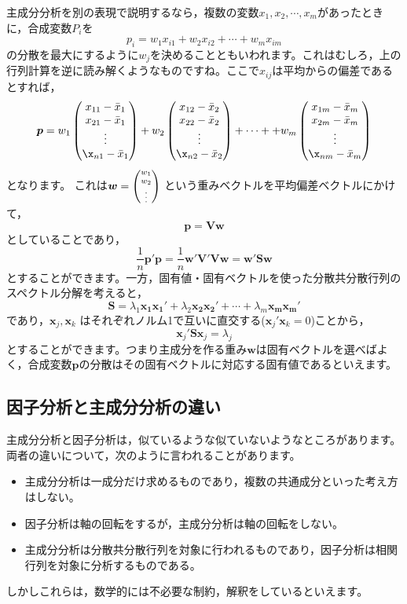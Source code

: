 \documentclass{ltjsbook}
\begin{document}
主成分分析を別の表現で説明するなら，複数の変数$x_1,x_2,\cdots,x_m$があったときに，合成変数$P_i$を
\[ p_i = w_1x_{i1} + w_2x_{i2}+\cdots+w_mx_{im} \]
の分散を最大にするように$w_j$を決めることともいわれます。これはむしろ，上の行列計算を逆に読み解くようなものですね。ここで$x_{ij}$は平均からの偏差であるとすれば，
\[\bm{p} = w_1\begin{pmatrix}x_{11}-\bar{x}_1\\x_{21}-\bar{x}_1\\\vdots\\\x_{n1}-\bar{x}_1\end{pmatrix}
	+w_2 \begin{pmatrix}x_{12}-\bar{x}_2\\x_{22}-\bar{x}_2\\\vdots\\\x_{n2}-\bar{x}_2\end{pmatrix}
	+\cdots+
	+w_m \begin{pmatrix}x_{1m}-\bar{x}_m\\x_{2m}-\bar{x}_m\\\vdots\\\x_{nm}-\bar{x}_m\end{pmatrix}
\]
となります。
これは$\bm{w} =\scriptsize \begin{pmatrix}w_1\\w_2\\\vdots\end{pmatrix}$ という重みベクトルを平均偏差ベクトルにかけて，
\[ \bm{p}=\bm{Vw} \]
としていることであり，
\[ \frac{1}{n}\bm{p}'\bm{p} = \frac{1}{n}\bm{w}'\bm{V}'\bm{V}\bm{w} = \bm{w}'\bm{Sw}\]
とすることができます。一方，固有値・固有ベクトルを使った分散共分散行列のスペクトル分解を考えると，
\[ \bm{S} = \lambda_1 \bm{x_1x_1}'+\lambda_2 \bm{x_2x_2}'+\cdots+\lambda_m \bm{x_mx_m}'\]
であり，$\bm{x}_j,\bm{x}_k$ はそれぞれノルム1で互いに直交する($\bm{x}_j'\bm{x}_k=0$)ことから，
\[ \bm{x}_j'\bm{Sx}_j = \lambda_j \]
とすることができます。つまり主成分を作る重み$\bm{w}$は固有ベクトルを選べばよく，合成変数$\bm{p}$の分散はその固有ベクトルに対応する固有値であるといえます。
\subsection{因子分析と主成分分析の違い}
主成分分析と因子分析は，似ているような似ていないようなところがあります。両者の違いについて，次のように言われることがあります。
\begin{itemize}
	\item 主成分分析は一成分だけ求めるものであり，複数の共通成分といった考え方はしない。
	\item 因子分析は軸の回転をするが，主成分分析は軸の回転をしない。
	\item 主成分分析は分散共分散行列を対象に行われるものであり，因子分析は相関行列を対象に分析するものである。
\end{itemize}
しかしこれらは，数学的には不必要な制約，解釈をしているといえます。
\end{document}
